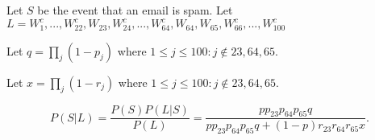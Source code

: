 Let $S$ be the event that an email is spam. Let $L = W_{1}^{c},...,W_{22}^{c},
W_{23},W_{24}^{c},...,W_{64}^{c},W_{64},W_{65},W_{66}^{c},...,W_{100}^{c}$


Let $q = \prod_{j}(1-p_{j})$ where $1 \leq j \leq 100: j \notin 23, 64,
65$.

Let $x = \prod_{j}(1-r_{j})$ where $1 \leq j \leq 100: j \notin 23, 64, 65$.

$$P(S|L) = \frac{P(S)P(L|S)}{P(L)} = \frac{pp_{23}p_{64}p_{65}q}{pp_{23}p_{64}p_
{65}q + (1-p)r_{23}r_{64}r_{65}x}.$$